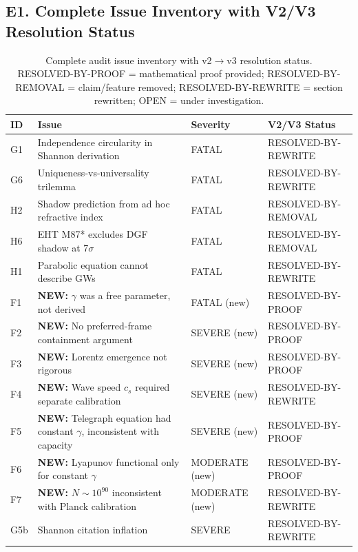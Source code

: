 \documentclass[reprint]{revtex4-2}
\begin{document}
\subsection{E1. Complete Issue Inventory with V2/V3 Resolution Status}

\begin{table}[h]
\caption{Complete audit issue inventory with v2$\to$v3 resolution status.\\
RESOLVED-BY-PROOF = mathematical proof provided; RESOLVED-BY-REMOVAL = claim/feature removed; RESOLVED-BY-REWRITE = section rewritten; OPEN = under investigation.}
\begin{tabular}{p{0.5cm}p{5.5cm}ll}
\toprule
ID & Issue & Severity & V2/V3 Status \\
\midrule
G1 & Independence circularity in Shannon derivation & FATAL & RESOLVED-BY-REWRITE \\
G6 & Uniqueness-vs-universality trilemma & FATAL & RESOLVED-BY-REWRITE \\
H2 & Shadow prediction from ad hoc refractive index & FATAL & RESOLVED-BY-REMOVAL \\
H6 & EHT M87* excludes DGF shadow at 7$\sigma$ & FATAL & RESOLVED-BY-REMOVAL \\
H1 & Parabolic equation cannot describe GWs & FATAL & RESOLVED-BY-REWRITE \\
F1 & \textbf{NEW:} $\gamma$ was a free parameter, not derived & FATAL (new) & RESOLVED-BY-PROOF \\
F2 & \textbf{NEW:} No preferred-frame containment argument & SEVERE (new) & RESOLVED-BY-PROOF \\
F3 & \textbf{NEW:} Lorentz emergence not rigorous & SEVERE (new) & RESOLVED-BY-PROOF \\
F4 & \textbf{NEW:} Wave speed $c_s$ required separate calibration & SEVERE (new) & RESOLVED-BY-REWRITE \\
F5 & \textbf{NEW:} Telegraph equation had constant $\gamma$, inconsistent with capacity & SEVERE (new) & RESOLVED-BY-PROOF \\
F6 & \textbf{NEW:} Lyapunov functional only for constant $\gamma$ & MODERATE (new) & RESOLVED-BY-PROOF \\
F7 & \textbf{NEW:} $N\sim 10^{90}$ inconsistent with Planck calibration & MODERATE (new) & RESOLVED-BY-REWRITE \\
G5b & Shannon citation inflation & SEVERE & RESOLVED-BY-REWRITE \\

\end{tabular}
\end{table}
\end{document}
